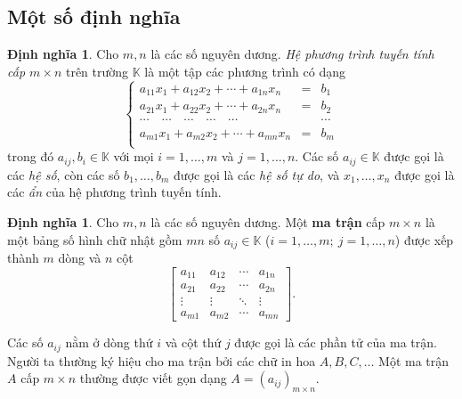 \documentclass[12pt,a4paper,oneside]{book}
\theoremstyle{theorem}
\theoremstyle{definition}
\newtheorem{dn}[theorem2]{Định nghĩa}
\begin{document}
    \subsection{Một số định nghĩa}
    \begin{dn}
      Cho $m, n$ là các số nguyên dương. \textit{Hệ phương trình tuyến tính cấp $m \times n$} trên trường $\mathbb{K}$ là một tập các phương trình có dạng
\begin{equation} 
\left\{
\begin{array}{lcl}
a_{11}x_1 + a_{12}x_2 + \cdots + a_{1n}x_n &=& b_1 \\
a_{21}x_1 + a_{22}x_2 + \cdots + a_{2n}x_n &=& b_2 \\
\cdots \quad \cdots \quad \cdots \quad \cdots \quad \cdots && \cdots \\
a_{m1}x_1 + a_{m2}x_2 + \cdots + a_{mn}x_n &=& b_m \\
\end{array}
\right.
\end{equation}
trong đó $a_{ij}, b_i \in \mathbb{K}$ với mọi $i = 1, \dots, m$ và $j = 1, \dots, n$. Các số $a_{ij} \in \mathbb{K}$ được gọi là các \textit{hệ số}, còn các số $b_1, \dots, b_m$ được gọi là các \textit{hệ số tự do}, và $x_1, \dots, x_n$ được gọi là các \textit{ẩn} của hệ phương trình tuyến tính.
    \end{dn}
\begin{dn}
    Cho $m, n$ là các số nguyên dương. Một \textbf{ma trận} cấp $m \times n$ là một bảng số hình chữ nhật gồm $mn$ số $a_{ij} \in \mathbb{K}$ ($i = 1, \ldots, m;\ j = 1, \ldots, n$) được xếp thành $m$ dòng và $n$ cột
\[
\begin{bmatrix}
a_{11} & a_{12} & \cdots & a_{1n} \\
a_{21} & a_{22} & \cdots & a_{2n} \\
\vdots & \vdots & \ddots & \vdots \\
a_{m1} & a_{m2} & \cdots & a_{mn}
\end{bmatrix}.
\]

Các số $a_{ij}$ nằm ở dòng thứ $i$ và cột thứ $j$ được gọi là các phần tử của ma trận. Người ta thường ký hiệu cho ma trận bởi các chữ in hoa $A, B, C, \ldots$ Một ma trận $A$ cấp $m \times n$ thường được viết gọn dạng $A = (a_{ij})_{m \times n}$.
\end{dn}
\end{document}
